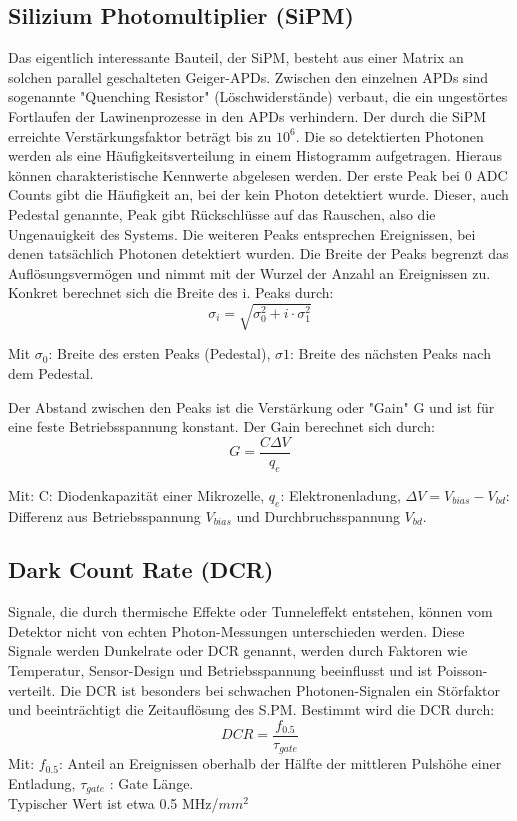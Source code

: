 \documentclass[12pt]{article}
\begin{document}
\subsection{Silizium Photomultiplier (SiPM)}
Das eigentlich interessante Bauteil, der SiPM, besteht aus einer Matrix an solchen parallel geschalteten  Geiger-APDs. Zwischen den einzelnen APDs sind sogenannte "Quenching Resistor" (Löschwiderstände) verbaut, die ein ungestörtes Fortlaufen der Lawinenprozesse in den APDs verhindern.
Der durch die SiPM erreichte Verstärkungsfaktor beträgt bis zu $10^{6}$.
Die so detektierten Photonen werden als eine Häufigkeitsverteilung in einem Histogramm aufgetragen.
Hieraus können charakteristische Kennwerte abgelesen werden.
Der erste Peak bei 0 ADC Counts gibt die Häufigkeit an, bei der kein Photon detektiert wurde.
Dieser, auch Pedestal genannte, Peak gibt Rückschlüsse auf das Rauschen, also die Ungenauigkeit des Systems.
Die weiteren Peaks entsprechen Ereignissen, bei denen tatsächlich Photonen detektiert wurden.
Die Breite der Peaks begrenzt das Auflösungsvermögen und nimmt mit der Wurzel der Anzahl an Ereignissen zu.
Konkret berechnet sich die Breite des i. Peaks durch:
\begin{equation}
\sigma_{i} = \sqrt{\sigma_{0}^{2}+i \cdot \sigma_{1}^{2}}\label{S}
\end{equation}

Mit $\sigma_{0}$: Breite des ersten Peaks (Pedestal), $\sigma{1}$: Breite des nächsten Peaks nach dem Pedestal.

Der Abstand zwischen den Peaks ist die Verstärkung oder "Gain" G und ist für eine feste Betriebsspannung konstant.
Der Gain berechnet sich durch:
\begin{equation}
G = \frac{C\Delta V}{q_{e}}
\end{equation}

Mit: C: Diodenkapazität einer Mikrozelle, $q_{e}$: Elektronenladung, $\Delta V = V_{bias}-V_{bd}$: Differenz aus Betriebsspannung $V_{bias}$ und Durchbruchsspannung $V_{bd}$.

\subsection{Dark Count Rate (DCR)}
Signale, die durch thermische Effekte oder Tunneleffekt entstehen, können vom Detektor nicht von echten Photon-Messungen unterschieden werden.
Diese Signale werden Dunkelrate oder DCR genannt, werden durch Faktoren wie Temperatur, Sensor-Design und Betriebsspannung beeinflusst und ist Poisson-verteilt.
Die DCR ist besonders bei schwachen Photonen-Signalen ein Störfaktor und beeinträchtigt die Zeitauflösung des S\@.PM.
Bestimmt wird die DCR durch:
\begin{equation}
DCR = \frac{f_{0.5}}{\tau_{gate}}
\end{equation}
Mit: $f_{0.5}$: Anteil an Ereignissen oberhalb der Hälfte der mittleren Pulshöhe einer Entladung, $\tau_{gate}$ : Gate Länge.
\\ Typischer Wert ist etwa 0.5 MHz/$mm^2$
\end{document}
